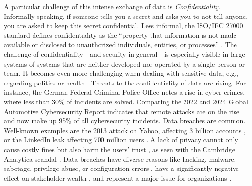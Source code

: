 A particular challenge of this intense exchange of data is \emph{Confidentiality}.
Informally speaking, if someone tells you a secret and asks you to not tell anyone, you are asked to keep this secret confidential.
Less informal, the ISO/IEC 27000 standard defines confidentiality as the \enquote{property that information is not made available or disclosed to unauthorized individuals, entities, or processes} \cite{international_organization_for_standardization_isoiec_2018}.
The challenge of confidentiality---and security in general---is especially visible in large systems of systems \cite{olivero_security_2019} that are neither developed nor operated by a single person or team.
It becomes even more challenging when dealing with sensitive data, e.g., regarding politics \cite{weisbaum_trust_2018} or health  \cite{enaya_case_2024}.
Threats to the confidentiality of data are rising.
For instance, the German Federal Criminal Police Office notes a rise in cyber crimes, where less than 30\% of incidents are solved.
Comparing the 2022 and 2024 Global Automotive Cybersecurity Report \cite{upstream_2022_2022,upstream_2024_2024} indicates that remote attacks are on the rise and now make up 95\% of all cybersecurity incidents.
Data breaches are common.
Well-known examples are the 2013 attack on Yahoo, affecting 3 billion accounts \cite{haselton_yahoo_2017}, or the LinkedIn leak affecting 700 million users \cite{morris_massive_2021}.
A lack of privacy cannot only cause costly fines \cite{european_data_protection_board_hamburg_2020} but also harm the users' trust \cite{weisbaum_trust_2018}, as seen with the Cambridge Analytica scandal \cite{isaak_user_2018}.
Data breaches have diverse reasons like hacking, malware, sabotage, privilege abuse, or configuration errors \cite{cheng_enterprise_2017}, have a significantly negative effect on stakeholder wealth \cite{gatzlaff_effect_2010}, and represent a major issue for organizations \cite{ayyagari_exploratory_2012}.

